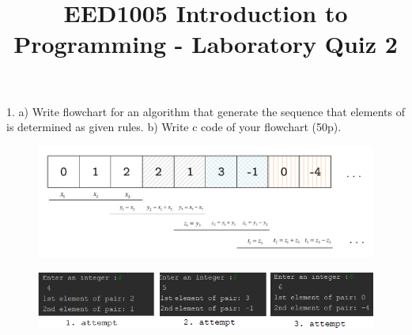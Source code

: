 \documentclass[10pt,a4paper]{article}
\title{\centering 
	EED1005 Introduction to Programming	- Laboratory Quiz 2}
\begin{document}
	\maketitle	

		 1. a) Write flowchart for an algorithm that generate the sequence that elements of is determined as \indent  given rules.
		 b) Write c code of your flowchart (50p). 
		\begin{figure}[htbp]
			\centering
		\includegraphics[scale=0.75]{sspdf}
		\end{figure}
		\begin{figure}[htbp]
		\centering
		\includegraphics[scale=0.9]{ss2}
	\end{figure}
		
		\newpage
		
\end{document}
